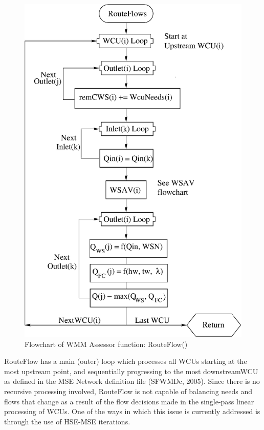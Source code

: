 \begin{figure}
 \begin{center}
  \includegraphics[scale=.33]{Graphics/flowchartRouteFlow.eps}
 \end{center}
 \caption{\label{fig:flowchartRouteFlow} Flowchart of WMM Assessor function: RouteFlow()}
\end{figure}
 
RouteFlow has a main (outer) loop which processes all WCUs starting at
the most upstream point, and sequentially progressing to the most
downstreamWCU as defined in the MSE Network definition file (SFWMDc,
2005)\nocite{sfwmdc:2005}. Since there is no recursive processing
involved, RouteFlow is not capable of balancing needs and flows that
change as a result of the flow decisions made in the single-pass
linear processing of WCUs. One of the ways in which this issue is
currently addressed is through the use of HSE-MSE iterations.

